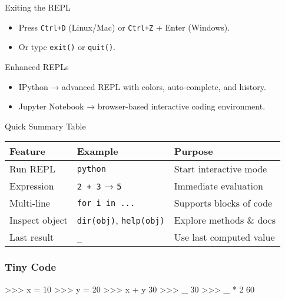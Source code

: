\documentclass[
  letterpaper,
  DIV=11,
  numbers=noendperiod]{scrreprt}
\newenvironment{Shaded}{\begin{snugshade}}{\end{snugshade}}
\newcommand{\DecValTok}[1]{\textcolor[rgb]{0.68,0.00,0.00}{#1}}
\newcommand{\NormalTok}[1]{\textcolor[rgb]{0.00,0.23,0.31}{#1}}
\newcommand{\OperatorTok}[1]{\textcolor[rgb]{0.37,0.37,0.37}{#1}}
\providecommand{\tightlist}{%
  \setlength{\itemsep}{0pt}\setlength{\parskip}{0pt}}
\begin{document}
Exiting the REPL

\begin{itemize}
\tightlist
\item
  Press \texttt{Ctrl+D} (Linux/Mac) or \texttt{Ctrl+Z} + Enter
  (Windows).
\item
  Or type \texttt{exit()} or \texttt{quit()}.
\end{itemize}

Enhanced REPLs

\begin{itemize}
\tightlist
\item
  IPython → advanced REPL with colors, auto-complete, and history.
\item
  Jupyter Notebook → browser-based interactive coding environment.
\end{itemize}

Quick Summary Table

\begin{longtable}[]{@{}lll@{}}
\toprule\noalign{}
Feature & Example & Purpose \\
\midrule\noalign{}
\endhead
\bottomrule\noalign{}
\endlastfoot
Run REPL & \texttt{python} & Start interactive mode \\
Expression & \texttt{2\ +\ 3} → \texttt{5} & Immediate evaluation \\
Multi-line & \texttt{for\ i\ in\ ...} & Supports blocks of code \\
Inspect object & \texttt{dir(obj)}, \texttt{help(obj)} & Explore methods
\& docs \\
Last result & \texttt{\_} & Use last computed value \\
\end{longtable}

\subsubsection{Tiny Code}\label{tiny-code-90}

\begin{Shaded}
\begin{Highlighting}[]
\OperatorTok{\textgreater{}\textgreater{}\textgreater{}}\NormalTok{ x }\OperatorTok{=} \DecValTok{10}
\OperatorTok{\textgreater{}\textgreater{}\textgreater{}}\NormalTok{ y }\OperatorTok{=} \DecValTok{20}
\OperatorTok{\textgreater{}\textgreater{}\textgreater{}}\NormalTok{ x }\OperatorTok{+}\NormalTok{ y}
\DecValTok{30}
\OperatorTok{\textgreater{}\textgreater{}\textgreater{}}\NormalTok{ \_}
\DecValTok{30}
\OperatorTok{\textgreater{}\textgreater{}\textgreater{}}\NormalTok{ \_ }\OperatorTok{*} \DecValTok{2}
\DecValTok{60}
\end{Highlighting}
\end{Shaded}
\end{document}

